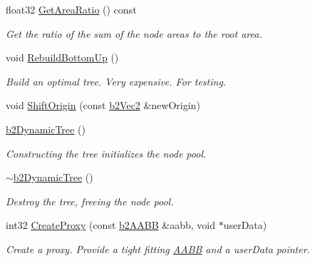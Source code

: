 \begin{DoxyCompactItemize}
\mbox{\label{classb2DynamicTree_a87da9819c4f190faec38f7fe4608caae}} 
float32 \hyperlink{classb2DynamicTree_a87da9819c4f190faec38f7fe4608caae}{Get\+Area\+Ratio} () const
\begin{DoxyCompactList}\small\item\em Get the ratio of the sum of the node areas to the root area. \end{DoxyCompactList}\item 
\mbox{\label{classb2DynamicTree_abd146017cfec1cf5ea7b87331f30a3ff}} 
void \hyperlink{classb2DynamicTree_abd146017cfec1cf5ea7b87331f30a3ff}{Rebuild\+Bottom\+Up} ()
\begin{DoxyCompactList}\small\item\em Build an optimal tree. Very expensive. For testing. \end{DoxyCompactList}\item 
void \hyperlink{classb2DynamicTree_af37ddfed6a5da97d5a78b09918d19ceb}{Shift\+Origin} (const \hyperlink{structb2Vec2}{b2\+Vec2} \&new\+Origin)
\item 
\mbox{\label{classb2DynamicTree_a8af64cf6a1566fa4c5b5c9683bd937d9}} 
\hyperlink{classb2DynamicTree_a8af64cf6a1566fa4c5b5c9683bd937d9}{b2\+Dynamic\+Tree} ()
\begin{DoxyCompactList}\small\item\em Constructing the tree initializes the node pool. \end{DoxyCompactList}\item 
\mbox{\label{classb2DynamicTree_a9060565fc63b4dd87d9560775c076786}} 
\hyperlink{classb2DynamicTree_a9060565fc63b4dd87d9560775c076786}{$\sim$b2\+Dynamic\+Tree} ()
\begin{DoxyCompactList}\small\item\em Destroy the tree, freeing the node pool. \end{DoxyCompactList}\item 
\mbox{\label{classb2DynamicTree_ae44676f12977dada46037da47fc7ffbf}} 
int32 \hyperlink{classb2DynamicTree_ae44676f12977dada46037da47fc7ffbf}{Create\+Proxy} (const \hyperlink{structb2AABB}{b2\+A\+A\+BB} \&aabb, void $\ast$user\+Data)
\begin{DoxyCompactList}\small\item\em Create a proxy. Provide a tight fitting \hyperlink{classAABB}{A\+A\+BB} and a user\+Data pointer. \end{DoxyCompactList}\item 

\end{DoxyCompactItemize}
